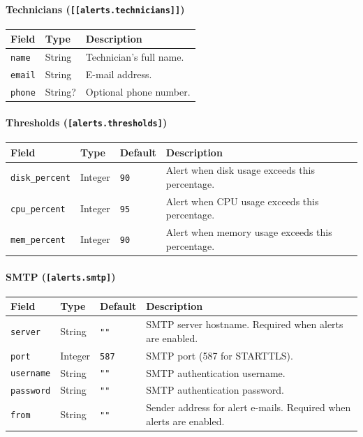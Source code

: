 \documentclass[12pt]{report}
\begin{document}
\paragraph{Technicians (\texttt{[[alerts.technicians]]})}

\begin{longtable}{@{} l l p{7cm} @{}}
\toprule
\textbf{Field} & \textbf{Type} & \textbf{Description} \\
\midrule
\texttt{name} & String & Technician's full name. \\
\texttt{email} & String & E-mail address. \\
\texttt{phone} & String? & Optional phone number. \\
\bottomrule
\end{longtable}

\paragraph{Thresholds (\texttt{[alerts.thresholds]})}

\begin{longtable}{@{} l l l p{5cm} @{}}
\toprule
\textbf{Field} & \textbf{Type} & \textbf{Default} & \textbf{Description} \\
\midrule
\texttt{disk\_percent} & Integer & \texttt{90} & Alert when disk usage exceeds
    this percentage. \\
\texttt{cpu\_percent} & Integer & \texttt{95} & Alert when CPU usage exceeds
    this percentage. \\
\texttt{mem\_percent} & Integer & \texttt{90} & Alert when memory usage exceeds
    this percentage. \\
\bottomrule
\end{longtable}

\paragraph{SMTP (\texttt{[alerts.smtp]})}

\begin{longtable}{@{} l l l p{5cm} @{}}
\toprule
\textbf{Field} & \textbf{Type} & \textbf{Default} & \textbf{Description} \\
\midrule
\texttt{server} & String & \texttt{""} & SMTP server hostname. Required when
    alerts are enabled. \\
\texttt{port} & Integer & \texttt{587} & SMTP port (587 for STARTTLS). \\
\texttt{username} & String & \texttt{""} & SMTP authentication username. \\
\texttt{password} & String & \texttt{""} & SMTP authentication password. \\
\texttt{from} & String & \texttt{""} & Sender address for alert e-mails.
    Required when alerts are enabled. \\
\bottomrule
\end{longtable}
\end{document}
